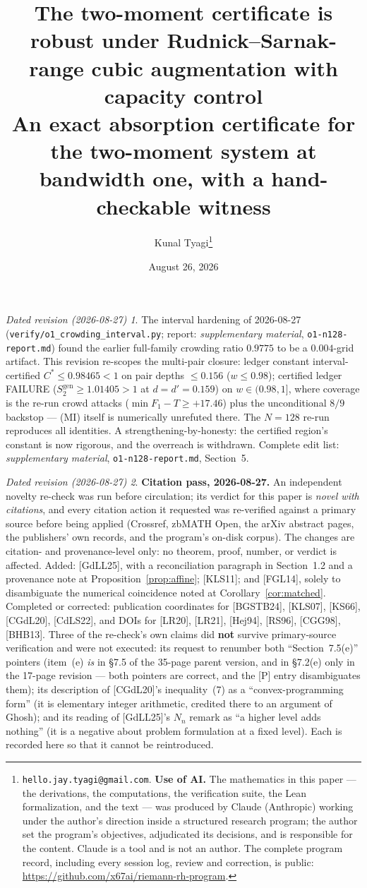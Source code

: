\documentclass[11pt]{article}
\title{The two-moment certificate is robust under Rudnick--Sarnak-range cubic
augmentation with capacity control\\[2ex]
\large An exact absorption certificate for the two-moment system at bandwidth
one, with a hand-checkable witness}
\author{Kunal Tyagi\thanks{%
\texttt{hello.jay.tyagi@gmail.com}. \textbf{Use of AI.} The mathematics in this
paper --- the derivations, the computations, the verification suite, the Lean formalization, and the
text --- was produced by Claude (Anthropic) working under the author's direction
inside a structured research program; the author set the program's objectives,
adjudicated its decisions, and is responsible for the content. Claude is a tool and
is not an author. The complete program record, including every session log, review
and correction, is public: \url{https://github.com/x67ai/riemann-rh-program}.}}
\date{August 26, 2026}
\theoremstyle{plain}
\theoremstyle{definition}
\theoremstyle{remark}
\newtheorem*{datedrev}{Dated revision (2026-08-27)}
\newcommand{\Sgen}{S^{\mathrm{gen}}_{2}}
\begin{document}
\maketitle

\begin{datedrev}
The interval hardening of 2026-08-27
(\texttt{verify/}\allowbreak\texttt{o1\_}\allowbreak\texttt{crowding\_}\allowbreak\texttt{interval.py};
report: \emph{supplementary material}, \texttt{o1-n128-report.md}) found the
earlier full-family crowding ratio $0.9775$ to be a $0.004$-grid artifact.
This revision re-scopes the multi-pair closure: ledger constant
interval-certified $C^{*} \le 0.98465 < 1$ on pair depths $\le 0.156$
($w \le 0.98$); certified ledger FAILURE ($\Sgen \ge 1.01405 > 1$ at
$d = d' = 0.159$) on $w \in (0.98, 1]$, where coverage is the re-run crowd
attacks ($\min F_1 - T \ge +17.46$) plus the unconditional $8/9$ backstop ---
(MI) itself is numerically unrefuted there. The $N = 128$ re-run reproduces all
identities. A strengthening-by-honesty: the certified region's constant is now
rigorous, and the overreach is withdrawn. Complete edit list:
\emph{supplementary material}, \texttt{o1-n128-report.md}, Section~5.
\end{datedrev}

\begin{datedrev}
\textbf{Citation pass, 2026-08-27.} An independent novelty re-check was run before
circulation; its verdict for this paper is \emph{novel with citations}, and every
citation action it requested was re-verified against a primary source before being
applied (Crossref, zbMATH Open, the arXiv abstract pages, the publishers' own
records, and the program's on-disk corpus). The changes are citation- and
provenance-level only: no theorem, proof, number, or verdict is affected. Added:
[GdLL25], with a reconciliation paragraph in Section~1.2 and a provenance note at
Proposition~\ref{prop:affine}; [KLS11]; and [FGL14], solely to disambiguate the
numerical coincidence noted at Corollary~\ref{cor:matched}. Completed or corrected:
publication coordinates for [BGSTB24], [KLS07], [KS66], [CGdL20], [CdLS22], and DOIs
for [LR20], [LR21], [Hej94], [RS96], [CGG98], [BHB13]. Three of the re-check's own
claims did \textbf{not} survive primary-source verification and were not executed:
its request to renumber both ``Section~7.5(e)'' pointers (item~(e) \emph{is} in
\S7.5 of the 35-page parent version, and in \S7.2(e) only in the 17-page revision
--- both pointers are correct, and the [P] entry disambiguates them); its description
of [CGdL20]'s inequality~(7) as a ``convex-programming form'' (it is elementary
integer arithmetic, credited there to an argument of Ghosh); and its reading of
[GdLL25]'s $N_n$ remark as ``a higher level adds nothing'' (it is a negative about
problem formulation at a fixed level). Each is recorded here so that it cannot be
reintroduced.
\end{datedrev}
\end{document}

